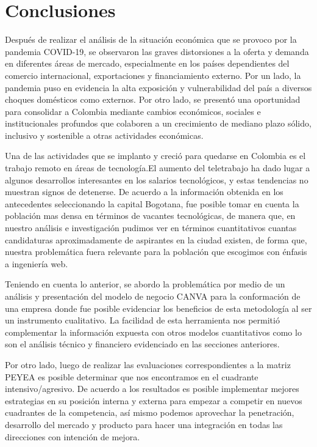 \section{Conclusiones}

Después de realizar el análisis de la situación económica que se provoco por la pandemia COVID-19, se observaron las graves distorsiones a la oferta y demanda en diferentes áreas de mercado, especialmente en los países dependientes del comercio internacional, exportaciones y financiamiento externo. Por un lado, la pandemia puso en evidencia la alta exposición y vulnerabilidad del país a diversos choques domésticos como externos. Por otro lado, se presentó una oportunidad para  consolidar a Colombia mediante cambios  económicos,  sociales  e  institucionales profundos \cite{desafios} que  colaboren  a  un  crecimiento  de  mediano  plazo  sólido,  inclusivo  y  sostenible  a otras actividades económicas.

Una de las actividades que se implanto y creció para quedarse en Colombia es el trabajo remoto en áreas de tecnología.El aumento del teletrabajo ha dado lugar a algunos desarrollos interesantes en los salarios tecnológicos, y estas tendencias no muestran signos de detenerse. De acuerdo a la información obtenida en los antecedentes seleccionando la capital Bogotana, fue posible tomar en cuenta la población mas densa en términos de vacantes tecnológicas, de manera que, en nuestro análisis e investigación pudimos ver en términos cuantitativos cuantas  candidaturas aproximadamente de aspirantes en la ciudad existen, de forma que, nuestra problemática fuera relevante para la población que escogimos con énfasis a ingeniería web. 

Teniendo en cuenta lo anterior, se abordo la problemática por medio de un análisis y presentación del modelo de negocio CANVA para la conformación de una empresa donde fue posible evidenciar los beneficios de esta metodología al ser un instrumento cualitativo. La facilidad de esta herramienta nos permitió complementar la información expuesta con otros modelos cuantitativos como lo son el análisis técnico y financiero evidenciado en las secciones anteriores.

Por otro lado, luego de realizar las evaluaciones correspondientes a la matriz PEYEA es posible determinar que nos encontramos en el cuadrante intensivo/agresivo.  De acuerdo a los resultados es posible implementar  mejores estrategias en su posición interna y externa para empezar a competir en nuevos cuadrantes de la competencia, así mismo podemos aprovechar la penetración, desarrollo del mercado y producto para hacer una integración en todas las direcciones con intención de mejora.

